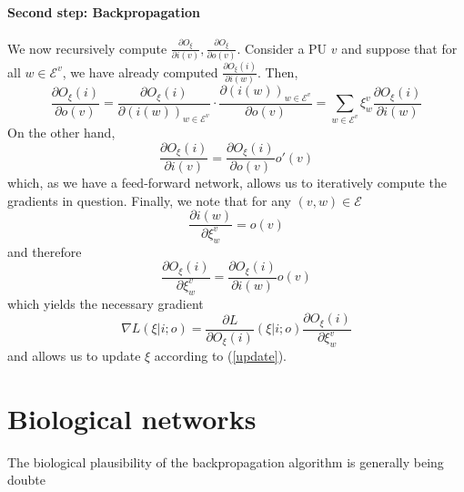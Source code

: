 \documentclass[a4paper,11pt]{article}
\begin{document}
\paragraph{Second step: Backpropagation}
We now recursively compute $\frac{\partial O_{\xi}}{\partial i(v)},\frac{\partial O_{\xi}}{\partial o(v)}$. Consider a PU $v$ and suppose that for all $w\in\mathcal{E}^v$, we have already computed $\frac{\partial O_{\xi}(i)}{\partial i(w)}$. Then,
\[
\frac{\partial O_{\xi}(i)}{\partial o(v)}=\frac{\partial O_{\xi}(i)}{\partial\left(i(w)\right)_{w\in\mathcal{E}^v}}\cdot\frac{\partial \left(i(w)\right)_{w\in\mathcal{E}^v}}{\partial o(v)}=\sum_{w\in\mathcal{E}^v}\xi^v_w\frac{\partial O_{\xi}(i)}{\partial i(w)}
\]
On the other hand, 
\[
\frac{\partial O_{\xi}(i)}{\partial i(v)}=\frac{\partial O_{\xi}(i)}{\partial o(v)}o'(v)
\]
which, as we have a feed-forward network, allows us to iteratively compute the gradients in question. Finally, we note that for any $(v,w)\in\mathcal{E}$
\begin{equation}
\frac{\partial i(w)}{\partial \xi^v_w}=o(v)
\end{equation}
and therefore
\begin{equation}
\frac{\partial O_{\xi}(i)}{\partial\xi^v_w}=\frac{\partial O_{\xi}(i)}{\partial i(w)}o(v)
\end{equation}
which yields the necessary gradient 
\begin{equation}
\nabla L(\xi|i;o)=\frac{\partial L}{\partial O_{\xi}(i)}(\xi|i;o)\frac{\partial O_{\xi}(i)}{\partial\xi^v_w}
\end{equation}
and allows us to update $\xi$ according to (\ref{update}).
\section{Biological networks}
The biological plausibility of the backpropagation algorithm is generally being doubte
\printbibliography
\end{document}
